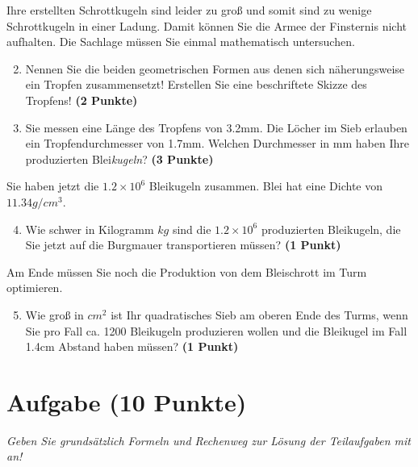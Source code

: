 \documentclass[a4paper, 9pt]{scrartcl}\usepackage[]{graphicx}\usepackage[]{xcolor}
\begin{document}
Ihre erstellten Schrottkugeln sind leider zu gro{\ss} und somit sind zu wenige
Schrottkugeln in einer Ladung. Damit k{\"o}nnen Sie die Armee der Finsternis
nicht aufhalten. Die Sachlage m{\"u}ssen Sie einmal mathematisch untersuchen.

\begin{enumerate}
  \setcounter{enumi}{1}
\item Nennen Sie die beiden geometrischen Formen aus denen sich
  n{\"a}herungsweise ein Tropfen zusammensetzt! Erstellen Sie eine beschriftete 
  Skizze des Tropfens!
  \textbf{(2 Punkte)}
\item Sie messen eine L{\"a}nge des Tropfens von 3.2mm. Die L{\"o}cher
  im Sieb erlauben ein Tropfendurchmesser von 1.7mm. Welchen
  Durchmesser in mm haben Ihre produzierten Blei\textit{kugeln}?  \textbf{(3 Punkte)}
\end{enumerate}

Sie haben jetzt die \ensuremath{1.2\times 10^{6}} Bleikugeln zusammen. Blei hat eine Dichte
von $11.34g/cm^3$.

\begin{enumerate}
  \setcounter{enumi}{3}
\item Wie schwer in Kilogramm $kg$ sind die \ensuremath{1.2\times 10^{6}} produzierten
  Bleikugeln, die Sie jetzt auf die Burgmauer transportieren m{\"u}ssen?
  \textbf{(1 Punkt)}
\end{enumerate}

Am Ende m{\"u}ssen Sie noch die Produktion von dem Bleischrott im Turm optimieren.

\begin{enumerate}
  \setcounter{enumi}{4}
\item Wie gro{\ss} in $cm^2$ ist Ihr quadratisches Sieb am oberen Ende des Turms,
  wenn Sie pro Fall ca. 1200 Bleikugeln produzieren wollen und
  die Bleikugel im Fall 1.4cm Abstand haben m{\"u}ssen?  \textbf{(1
    Punkt)}
\end{enumerate}
 
\clearpage

\section{Aufgabe \hfill (10 Punkte)}

\textit{Geben Sie grunds{\"a}tzlich Formeln und Rechenweg zur L{\"o}sung der
  Teilaufgaben mit an!} \\[1Ex]
\end{document}
